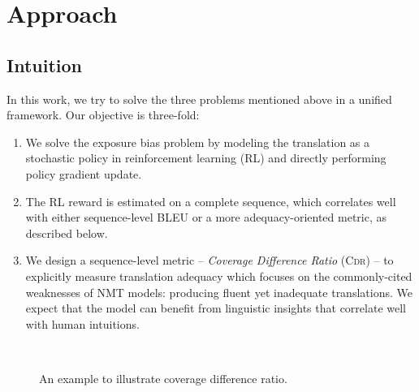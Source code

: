 \documentclass[letterpaper]{article} \usepackage{aaai19}  \usepackage{times}  \usepackage{helvet}  \usepackage{courier}  \usepackage{url}  \usepackage{graphicx}  \frenchspacing  \setlength{\pdfpagewidth}{8.5in}  \setlength{\pdfpageheight}{11in}  \usepackage{amsmath}
\begin{document}
\section{Approach}



\subsection{Intuition}




\noindent In this work, we try to solve the three problems mentioned above in a unified framework.
Our objective is three-fold:
\begin{enumerate}
    \item We solve the exposure bias problem by modeling the translation as a stochastic policy in reinforcement learning (RL) and directly performing policy gradient update.
    \item The RL reward is estimated on a complete sequence, which correlates well with either sequence-level BLEU or a more adequacy-oriented metric, as described below.
    \item We design a sequence-level metric -- {\em Coverage Difference Ratio} (\textsc{Cdr}) -- to explicitly measure translation adequacy which focuses on the commonly-cited  weaknesses of NMT models: producing fluent yet inadequate translations. We expect that the model can benefit from linguistic insights that correlate well with human intuitions.
\end{enumerate}



\begin{figure}[t]
\centering
{}
\\
\caption{An example to illustrate coverage difference ratio.}
\label{fig-example}

\end{figure}
\end{document}
